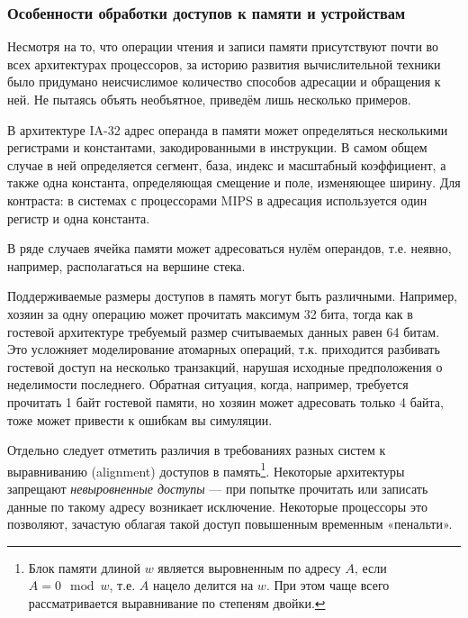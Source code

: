 \subsubsection{Особенности обработки доступов к памяти и устройствам}

Несмотря на то, что операции чтения и записи памяти присутствуют почти во всех архитектурах процессоров, за историю развития вычислительной техники было придумано неисчислимое количество способов адресации и обращения к ней. Не пытаясь объять необъятное, приведём лишь несколько примеров.

\begin{itemize*}

\item В архитектуре IA-32 адрес операнда в памяти может определяться несколькими регистрами и константами, закодированными в инструкции. В самом общем случае в ней определяется сегмент, база, индекс и масштабный коэффициент, а также одна константа, определяющая смещение и поле, изменяющее ширину. Для контраста: в системах с процессорами MIPS в адресация используется один регистр и одна константа.

\item В ряде случаев ячейка памяти может адресоваться нулём операндов, т.е. неявно, например, располагаться на вершине стека.

\item Поддерживаемые размеры доступов в память могут быть различными. Например, хозяин за одну операцию может прочитать максимум 32 бита, тогда как в гостевой архитектуре требуемый размер считываемых данных равен 64 битам. Это усложняет моделирование атомарных операций, т.к. приходится разбивать гостевой доступ на несколько транзакций, нарушая исходные предположения о неделимости последнего. Обратная ситуация, когда, например, требуется прочитать 1 байт гостевой памяти, но хозяин может адресовать только 4 байта, тоже может привести к ошибкам вы симуляции.

\item Отдельно следует отметить различия в требованиях разных систем к выравниванию (\abbr alignment) доступов в память\footnote{Блок памяти длиной $w$ является выровненным по адресу $A$, если $A = 0 \mod w$, т.е. $A$ нацело делится на $w$. При этом чаще всего рассматривается выравнивание по степеням двойки.}. Некоторые архитектуры запрещают \textit{невыровненные доступы} --- при попытке прочитать или записать данные по такому адресу возникает исключение. Некоторые процессоры это позволяют, зачастую облагая такой доступ повышенным временным «пенальти».
\end{itemize*}

